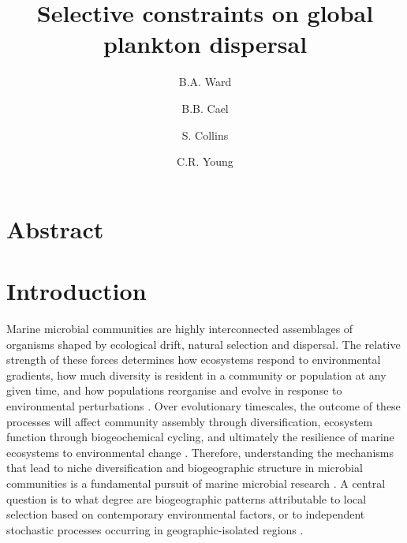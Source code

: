 \documentclass[12pt]{article}
\begin{document}
\title{Selective constraints on global plankton dispersal}

\author[1,*]{B.A. Ward}
\author[2]{B.B. Cael}
\author[3]{S. Collins}  
\author[2]{C.R. Young}


\date{} %

 

\maketitle
\onehalfspacing

\section*{Abstract}


\section*{Introduction}

Marine microbial communities are highly interconnected assemblages of organisms shaped by ecological drift, natural selection and dispersal. The relative strength of these forces determines how ecosystems respond to environmental gradients, how much diversity is resident in a community or population at any given time, and how populations reorganise and evolve in response to environmental perturbations \citep{?}. Over evolutionary timescales, the outcome of these processes will affect community assembly through diversification, ecosystem function through biogeochemical cycling, and ultimately the resilience of marine ecosystems to environmental change \citep{?}. Therefore, understanding the mechanisms that lead to niche diversification and biogeographic structure in microbial communities is a fundamental pursuit of marine microbial research \citep{?}. A central question is to what degree are biogeographic patterns attributable to local selection based on contemporary environmental factors, or to independent stochastic processes occurring in geographic-isolated regions \citep[Figure~\ref{HughesMartiny} and][]{Hughes-Martiny:2006}. 
\end{document}
